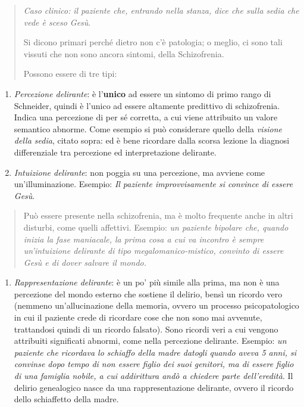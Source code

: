 \documentclass[]{article}
\begin{document}
\begin{quote}
\emph{Caso clinico:} \emph{il paziente che, entrando nella stanza, dice
che sulla sedia che vede è sceso Gesù}.

Si dicono primari perché dietro non c'è patologia; o meglio, ci sono
tali vissuti che non sono ancora sintomi, della Schizofrenia.

Possono essere di tre tipi:
\end{quote}

\begin{enumerate}
\def\labelenumi{\arabic{enumi}.}
\item
  \emph{Percezione delirante}: è l'\textbf{unico} ad essere un sintomo
  di primo rango di Schneider, quindi è l'unico ad essere altamente
  predittivo di schizofrenia. Indica una percezione di per sé corretta,
  a cui viene attribuito un valore semantico abnorme. Come esempio si
  può considerare quello della \emph{visione della sedia}, citato sopra:
  ed è bene ricordare dalla scorsa lezione la diagnosi differenziale tra
  percezione ed interpretazione delirante.
\item
  \emph{Intuizione delirante}: non poggia su una percezione, ma avviene
  come un'illuminazione. Esempio: \emph{Il paziente improvvisamente si
  convince di essere Gesù}.
\end{enumerate}

\begin{quote}
Può essere presente nella schizofrenia, ma è molto frequente anche in
altri disturbi, come quelli affettivi. Esempio: \emph{un paziente
bipolare che, quando inizia la fase maniacale, la prima cosa a cui va
incontro è sempre un'intuizione delirante di tipo megalomanico-mistico,
convinto di essere Gesù e di dover salvare il mondo.}
\end{quote}

\begin{enumerate}
\def\labelenumi{\arabic{enumi}.}
\item
  \emph{Rappresentazione delirante}: è un po' più simile alla prima, ma
  non è una percezione del mondo esterno che sostiene il delirio, bensì
  un ricordo vero (nemmeno un'allucinazione della memoria, ovvero un
  processo psicopatologico in cui il paziente crede di ricordare cose
  che non sono mai avvenute, trattandosi quindi di un ricordo falsato).
  Sono ricordi veri a cui vengono attribuiti significati abnormi, come
  nella percezione delirante. Esempio: \emph{un paziente che ricordava
  lo schiaffo della madre datogli quando aveva 5 anni, si convinse dopo
  tempo di non essere figlio dei suoi genitori, ma di essere figlio di
  una famiglia nobile, a cui addirittura andò a chiedere parte
  dell'eredità}. Il delirio genealogico nasce da una rappresentazione
  delirante, ovvero il ricordo dello schiaffetto della madre.
\end{enumerate}
\end{document}
